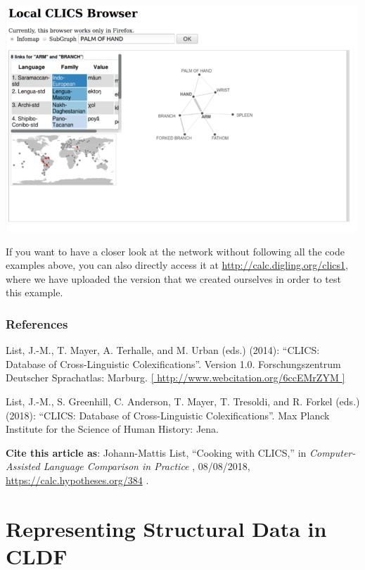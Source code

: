 \documentclass[
  english,
  a4paper,
  oneside,tablecaptionabove
]{scrbook}
\begin{document}
\href{http://calc.digling.org/clics1/graph.html?infomap_42_HAND}{\includegraphics[width=5.20833in,height=3.34375in]{images/__calc.hypotheses.org_files_2018_08_local-clics-500x321.png}}

If you want to have a closer look at the network without following all
the code examples above, you can also directly access it at
\url{http://calc.digling.org/clics1}, where we have uploaded the
version that we created ourselves in order to test this example.

\hypertarget{references}{\subsection*{References}\label{references}}

List, J.-M., T. Mayer, A. Terhalle, and M. Urban (eds.) (2014):
``CLICS: Database of Cross-Linguistic Colexifications''. Version
1.0. Forschungszentrum Deutscher Sprachatlas: Marburg.
\href{//www.webcitation.org/6ccEMrZYM”}{{[}
http://www.webcitation.org/6ccEMrZYM {]}}

List, J.-M., S. Greenhill, C. Anderson, T. Mayer, T. Tresoldi, and
R. Forkel (eds.) (2018): ``CLICS: Database of Cross-Linguistic
Colexifications''. Max Planck Institute for the Science of Human
History: Jena.

\textbf{Cite this article as}: Johann-Mattis List, ``Cooking with CLICS,''
in \emph{Computer-Assisted Language Comparison in Practice} ,
08/08/2018, \url{https://calc.hypotheses.org/384} .

\hypertarget{representing-structural-data-in-cldf}{%
\chapter{Representing Structural Data in
CLDF}\label{representing-structural-data-in-cldf}}
\end{document}
